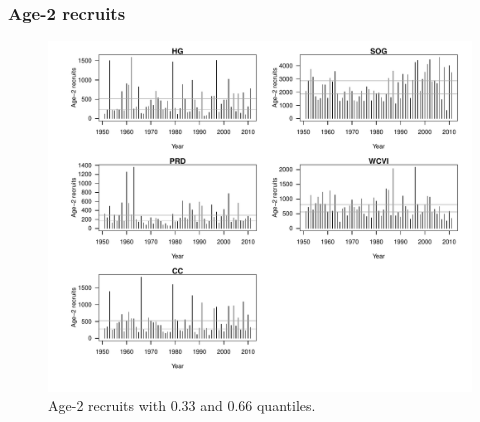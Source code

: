 \begin{frame}[t]\frametitle{Age-2 recruits}
	\begin{figure}[htbp]
		\centering
		\vspace{-1cm}	\includegraphics[scale=0.5]{../FIGS/qPriorFigs/iscam_fig_recruitment}
		\vspace{-1cm}
		\caption{Age-2 recruits with 0.33 and 0.66 quantiles.}
	\end{figure}
\end{frame}

